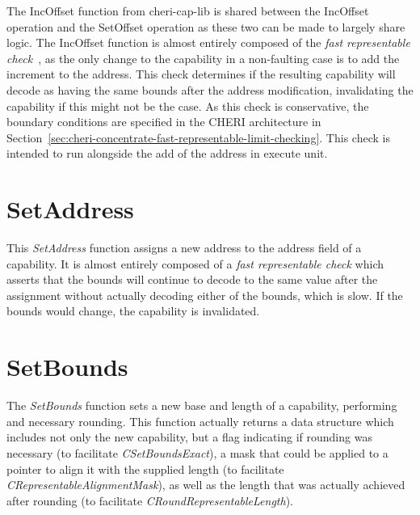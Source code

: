 The IncOffset function from cheri-cap-lib is shared between the IncOffset operation and the SetOffset operation as these two can be made to largely share logic.
The IncOffset function is almost entirely composed of the \emph{fast representable check}~\cite{Woodruff2019}, as the only change to the capability in a non-faulting case is to add the increment to the address.
This check determines if the resulting capability will decode as having the same bounds after the address modification, invalidating the capability if this might not be the case.
As this check is conservative, the boundary conditions are specified in the CHERI architecture in Section~\ref{sec:cheri-concentrate-fast-representable-limit-checking}.
This check is intended to run alongside the add of the address in execute unit.



\section{SetAddress}
\label{sec:cheri-128-listings-setaddress}

This \emph{SetAddress} function assigns a new address to the address field
of a capability.
It is almost entirely composed of a \emph{fast representable check} which asserts
that the bounds will continue to decode to the same value after the assignment
without actually decoding either of the bounds, which is slow.
If the bounds would change, the capability is invalidated.



\section{SetBounds}
\label{sec:cheri-128-listings-setbounds}

The \emph{SetBounds} function sets a new base and length of a capability, performing
and necessary rounding.
This function actually returns a data structure which includes not only the new capability,
but a flag indicating if rounding was necessary (to facilitate \emph{CSetBoundsExact}),
a mask that could be applied to a pointer to align it with the supplied length (to facilitate \emph{CRepresentableAlignmentMask}),
as well as the length that was actually achieved after rounding (to facilitate \emph{CRoundRepresentableLength}).


